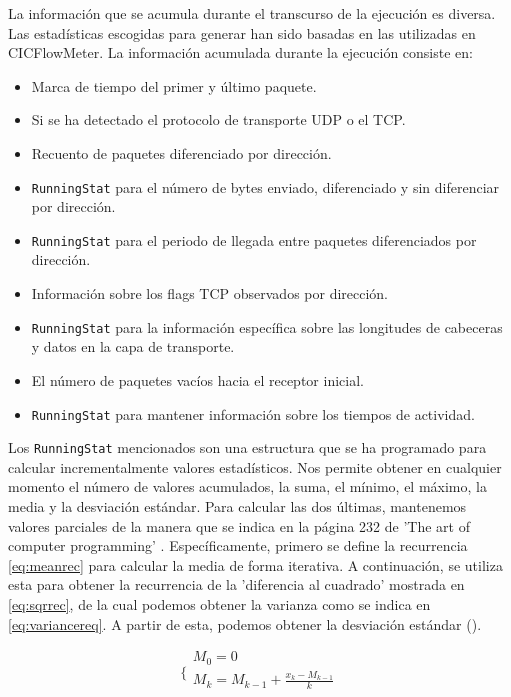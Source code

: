 \documentclass[10pt,a4paper,twoside]{article}
\begin{document}
\begin{multicols}{2}

    La información que se acumula durante el transcurso de la ejecución es diversa. Las estadísticas escogidas para generar han sido basadas en las utilizadas en CICFlowMeter. La información acumulada durante la ejecución consiste en:

    \begin{itemize}
        \item Marca de tiempo del primer y último paquete.
        \item Si se ha detectado el protocolo de transporte UDP o el TCP.
        \item Recuento de paquetes diferenciado por dirección.
        \item \texttt{RunningStat} para el número de bytes enviado, diferenciado y sin diferenciar por dirección.
        \item \texttt{RunningStat} para el periodo de llegada entre paquetes diferenciados por dirección.
        \item Información sobre los flags TCP observados por dirección.
        \item \texttt{RunningStat} para la información específica sobre las longitudes de cabeceras y datos en la capa de transporte.
        \item El número de paquetes vacíos hacia el receptor inicial.
        \item \texttt{RunningStat} para mantener información sobre los tiempos de actividad.
    \end{itemize}

    Los \texttt{RunningStat} mencionados son una estructura que se ha programado para calcular incrementalmente valores estadísticos. Nos permite obtener en cualquier momento el número de valores acumulados, la suma, el mínimo, el máximo, la media y la desviación estándar. Para calcular las dos últimas, mantenemos valores parciales de la manera que se indica en la página 232 de 'The art of computer programming' \cite{10.5555/270146}. Específicamente, primero se define la recurrencia \ref{eq:meanrec} para calcular la media de forma iterativa. A continuación, se utiliza esta para obtener la recurrencia de la 'diferencia al cuadrado' mostrada en \ref{eq:sqrrec}, de la cual podemos obtener la varianza como se indica en \ref{eq:variancereq}. A partir de esta, podemos obtener la desviación estándar (\sigma).

    \begin{equation} \label{eq:meanrec}
        \biggl\{
            \begin{array}{l}
              M_{0} = 0\\
              M_{k} = M_{k-1} + {\frac{ x_{k} - M_{k-1} }{k}}  \\
            \end{array} 
    \end{equation}
    

\end{multicols}
\end{document}
